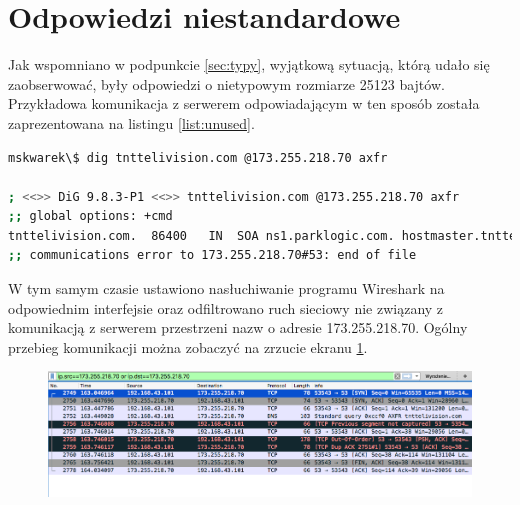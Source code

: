 \section{Odpowiedzi niestandardowe}
Jak wspomniano w podpunkcie \ref{sec:typy}, wyjątkową sytuacją, którą udało się zaobserwować, były odpowiedzi o nietypowym
rozmiarze 25123 bajtów. Przykładowa komunikacja z serwerem odpowiadającym w ten sposób została zaprezentowana na listingu
\ref{list:unused}.

\begin{lstlisting}[label={list:unused},captionpos=b,caption=Przykładowy odpowiedź serwera.,language=bash]
mskwarek\$ dig tnttelivision.com @173.255.218.70 axfr

; <<>> DiG 9.8.3-P1 <<>> tnttelivision.com @173.255.218.70 axfr
;; global options: +cmd
tnttelivision.com.	86400	IN	SOA	ns1.parklogic.com. hostmaster.tnttelivision.com. 2017061500 16384 2048 1048576 2560
;; communications error to 173.255.218.70#53: end of file
\end{lstlisting}

W tym samym czasie ustawiono nasłuchiwanie programu Wireshark \cite{wireshark} na odpowiednim interfejsie oraz odfiltrowano ruch sieciowy
nie związany z komunikacją z serwerem przestrzeni nazw o adresie 173.255.218.70. Ogólny przebieg komunikacji można zobaczyć na
zrzucie ekranu \ref{fig:unused_wireshark}.
\begin{figure}[h!]
\centering
\includegraphics[width=1.0\textwidth]{image/unused_wireshark}
	\caption{}
\label{fig:unused_wireshark}
\end{figure}

